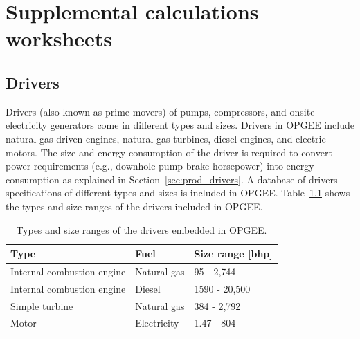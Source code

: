 \documentclass[11pt]{report}
\begin{document}
\begin{landscape}
\begin{tiny}
\begin{threeparttable}
\begin{supertabular*}{1\columnwidth}{p{0.05\columnwidth}p{0.25\columnwidth}p{0.25\columnwidth}p{0.05\columnwidth}p{0.05\columnwidth}p{0.05\columnwidth}p{0.05\columnwidth}p{0.05\columnwidth}}
\end{supertabular*}
\begin{tablenotes}
\end{tablenotes}
\end{threeparttable}
\end{tiny}

\end{landscape}


\clearpage


\chapter{Supplemental calculations worksheets}


\section{Drivers} \label{sec:drivers}

Drivers (also known as prime movers) of pumps, compressors, and onsite electricity generators come in different types and sizes. Drivers in OPGEE include natural gas driven engines, natural gas turbines, diesel engines, and electric motors. The size and energy consumption of the driver is required to convert power requirements (e.g., downhole pump brake horsepower) into energy consumption as explained in Section \,\ref{sec:prod_drivers}. A database of drivers specifications of different types and sizes is included in OPGEE. Table \,\ref{tab:drivers_size} shows the types and size ranges of the drivers included in OPGEE.
\begin{table}
\begin{scriptsize}
\caption{Types and size ranges of the drivers embedded in OPGEE.}
\label{tab:drivers_size}
\begin{tabular*}{1\columnwidth}{p{}p{}p{}}
\toprule
Type & Fuel & Size range [bhp] \\
\midrule
Internal combustion engine & Natural gas & 95 - 2,744 \\
Internal combustion engine & Diesel & 1590 - 20,500 \\
Simple turbine & Natural gas & 384 - 2,792 \\
Motor & Electricity & 1.47 - 804 \\
\bottomrule
\end{tabular*}
\end{scriptsize}
\end{table}
\end{document}

